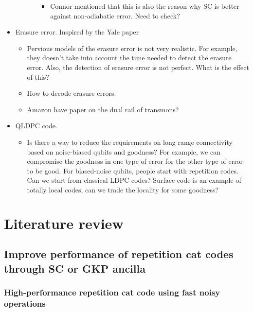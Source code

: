 \documentclass[a4paper,11pt]{article}
\begin{document}
\begin{itemize}
\begin{itemize}
\begin{itemize}
            \begin{itemize}
                \item Connor mentioned that this is also the reason why SC is better against non-adiabatic error. Need to check?
            \end{itemize}
        \end{itemize}
    \end{itemize}
    \item Erasure error. Inspired by the Yale paper
    \begin{itemize}
        \item Pervious models of the erasure error is not very realistic. For example, they doesn't take into account the time needed to detect the erasure error. Also, the detection of erasure error is not perfect. What is the effect of this?
        \item How to decode erasure errors. 
        \item Amazon have paper on the dual rail of transmons?
    \end{itemize}
    \item QLDPC code.
    \begin{itemize}
        \item Is there a way to reduce the requirements on long range connectivity based on noise-biased qubits and goodness? For example, we can compromise the goodness in one type of error for the other type of error to be good. For biased-noise qubits, people start with repetition codes. Can we start from classical LDPC codes? Surface code is an example of totally local codes, can we trade the locality for some goodness?
    \end{itemize}
\end{itemize}



\pagebreak


\section{Literature review}

\subsection{Improve performance of repetition cat codes through SC or GKP ancilla}

\subsubsection*{High-performance repetition cat code using fast noisy operations \cite{regent_high-performance_2023}}
\end{document}
